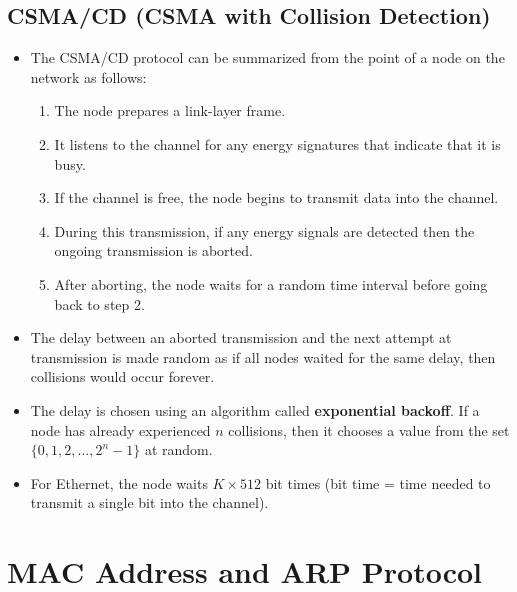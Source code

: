 \documentclass[a4paper]{article}
\theoremstyle{plain}
\theoremstyle{definition}
\begin{document}
\subsection{CSMA/CD (CSMA with Collision Detection)}
\begin{itemize}
    \item The CSMA/CD protocol can be summarized from the point of a node on the network as follows:
    
    \begin{enumerate}
        \item The node prepares a link-layer frame. 
        
        \item It listens to the channel for any energy signatures that indicate that it is busy. 
        
        \item If the channel is free, the node begins to transmit data into the channel. 
        
        \item During this transmission, if any energy signals are detected then the ongoing transmission is aborted.
        
        \item After aborting, the node waits for a random time interval before going back to step 2. 
    \end{enumerate}
    
    \item The delay between an aborted transmission and the next attempt at transmission is made random as if all nodes waited for the same delay, then collisions would occur forever. 
    
    \item The delay is chosen using an algorithm called \textbf{exponential backoff}. If a node has already experienced $n$ collisions, then it chooses a value from the set $\{0, 1, 2,..., 2^{n} -1 \}$ at random. 
    
    \item For Ethernet, the node waits $K \times 512$ bit times (bit time = time needed to transmit a single bit into the channel). 
\end{itemize}

\section{MAC Address and ARP Protocol}
\end{document}
